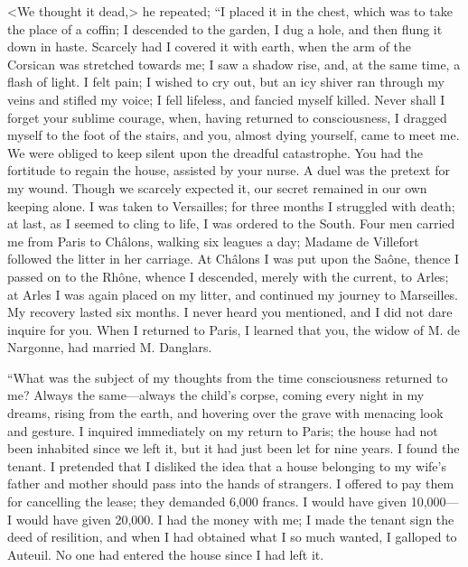  <We thought it dead,> he repeated; “I placed it in the chest, which was to take the place of a coffin; I descended to the garden, I dug a hole, and then flung it down in haste. Scarcely had I covered it with earth, when the arm of the Corsican was stretched towards me; I saw a shadow rise, and, at the same time, a flash of light. I felt pain; I wished to cry out, but an icy shiver ran through my veins and stifled my voice; I fell lifeless, and fancied myself killed. Never shall I forget your sublime courage, when, having returned to consciousness, I dragged myself to the foot of the stairs, and you, almost dying yourself, came to meet me. We were obliged to keep silent upon the dreadful catastrophe. You had the fortitude to regain the house, assisted by your nurse. A duel was the pretext for my wound. Though we scarcely expected it, our secret remained in our own keeping alone. I was taken to Versailles; for three months I struggled with death; at last, as I seemed to cling to life, I was ordered to the South. Four men carried me from Paris to Châlons, walking six leagues a day; Madame de Villefort followed the litter in her carriage. At Châlons I was put upon the Saône, thence I passed on to the Rhône, whence I descended, merely with the current, to Arles; at Arles I was again placed on my litter, and continued my journey to Marseilles. My recovery lasted six months. I never heard you mentioned, and I did not dare inquire for you. When I returned to Paris, I learned that you, the widow of M. de Nargonne, had married M. Danglars. 

 “What was the subject of my thoughts from the time consciousness returned to me? Always the same—always the child's corpse, coming every night in my dreams, rising from the earth, and hovering over the grave with menacing look and gesture. I inquired immediately on my return to Paris; the house had not been inhabited since we left it, but it had just been let for nine years. I found the tenant. I pretended that I disliked the idea that a house belonging to my wife's father and mother should pass into the hands of strangers. I offered to pay them for cancelling the lease; they demanded 6,000 francs. I would have given 10,000—I would have given 20,000. I had the money with me; I made the tenant sign the deed of resilition, and when I had obtained what I so much wanted, I galloped to Auteuil. No one had entered the house since I had left it. 

